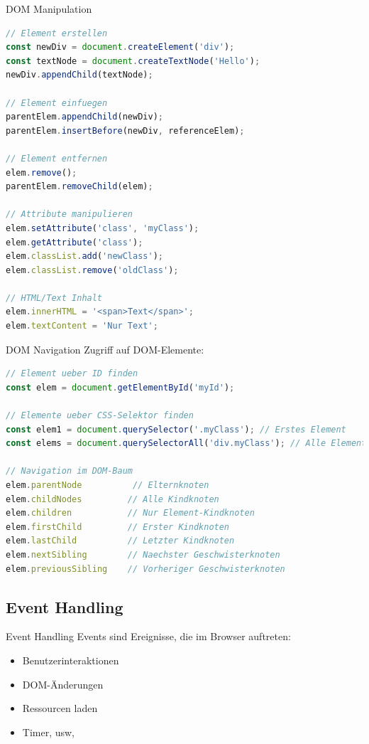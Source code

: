 \begin{code}{DOM Manipulation}
\begin{lstlisting}[language=JavaScript, style=basesmol]
// Element erstellen
const newDiv = document.createElement('div');
const textNode = document.createTextNode('Hello');
newDiv.appendChild(textNode);

// Element einfuegen
parentElem.appendChild(newDiv);
parentElem.insertBefore(newDiv, referenceElem);

// Element entfernen
elem.remove();
parentElem.removeChild(elem);

// Attribute manipulieren
elem.setAttribute('class', 'myClass');
elem.getAttribute('class');
elem.classList.add('newClass');
elem.classList.remove('oldClass');

// HTML/Text Inhalt
elem.innerHTML = '<span>Text</span>';
elem.textContent = 'Nur Text';
\end{lstlisting}
\end{code}

\begin{code}{DOM Navigation}
Zugriff auf DOM-Elemente:
\begin{lstlisting}[language=JavaScript, style=basesmol]
// Element ueber ID finden
const elem = document.getElementById('myId');

// Elemente ueber CSS-Selektor finden
const elem1 = document.querySelector('.myClass'); // Erstes Element
const elems = document.querySelectorAll('div.myClass'); // Alle Elemente

// Navigation im DOM-Baum
elem.parentNode          // Elternknoten
elem.childNodes         // Alle Kindknoten
elem.children           // Nur Element-Kindknoten
elem.firstChild         // Erster Kindknoten
elem.lastChild          // Letzter Kindknoten
elem.nextSibling        // Naechster Geschwisterknoten
elem.previousSibling    // Vorheriger Geschwisterknoten
\end{lstlisting}
\end{code}




\pagebreak

\subsection{Event Handling}

\begin{concept}{Event Handling}
    Events sind Ereignisse, die im Browser auftreten:
    \begin{itemize}
        \item Benutzerinteraktionen
        \item DOM-Änderungen
        \item Ressourcen laden
        \item Timer, usw,
    \end{itemize}
\end{concept}

